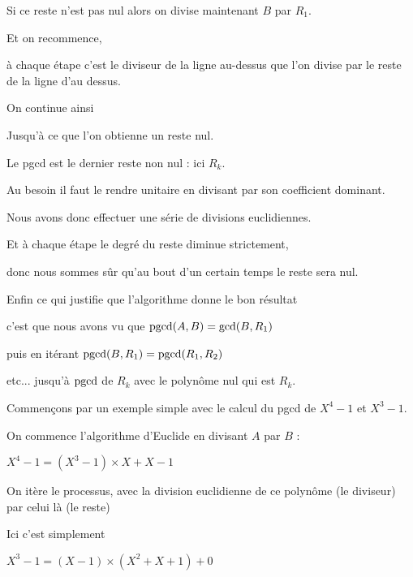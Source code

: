 Si ce reste n'est pas nul alors 
on divise maintenant $B$ par $R_1$.


\change

Et on recommence,

\change

à chaque étape c'est le diviseur de la ligne au-dessus
que l'on divise par le reste de la ligne d'au dessus.

\change

On continue ainsi

\change

Jusqu'à ce que l'on obtienne un reste nul.

\change

Le pgcd est le dernier reste non nul : ici $R_k$.

Au besoin il faut le rendre unitaire en divisant par son coefficient dominant.

\change

Nous avons donc effectuer une série de divisions euclidiennes.

\change

Et à chaque étape le degré du reste diminue strictement,

\change

donc nous sommes sûr qu'au  bout d'un certain temps le reste sera nul.

\change

Enfin ce qui justifie que l'algorithme donne le bon résultat

c'est que nous avons vu que $\mathop{\mathrm{pgcd}}\nolimits(A,B)=\gcd(B,R_1)$

puis en itérant $\mathop{\mathrm{pgcd}}\nolimits(B,R_1)= \mathop{\mathrm{pgcd}}\nolimits(R_1,R_2)$

etc... jusqu'à $\mathop{\mathrm{pgcd}}\nolimits$ de $R_k$ avec le polynôme nul qui est $R_k$.

\diapo

Commençons par un exemple simple avec le calcul
du pgcd de  $X^4-1$ et $X^3-1$.

\change

On commence l'algorithme d'Euclide en divisant $A$ par $B$ :

$X^4-1  =  (X^3-1) \times X + X-1$

On itère le processus, avec la division euclidienne de ce polynôme (le diviseur) 
par celui là (le reste)

\change

Ici c'est simplement 

$X^3-1 =  (X-1)\times (X^2+X+1) + 0$

